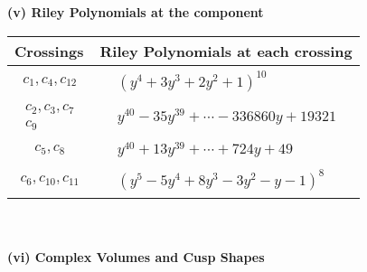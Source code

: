 \documentclass[1p]{elsarticle_modified}
\theoremstyle{definition}
\begin{document}
\newpage\renewcommand{\arraystretch}{1}
\flushleft \textbf{(v) Riley Polynomials at the component}\newline \\
\begin{tabular}{m{50pt}|m{274pt}}
Crossings & \hspace{64pt}Riley Polynomials at each crossing \\
\hline $$\begin{aligned}c_{1},c_{4},c_{12}\end{aligned}$$&$\begin{aligned}
&(y^4+3 y^3+2 y^2+1)^{10}
\end{aligned}$\\
\hline $$\begin{aligned}c_{2},c_{3},c_{7}\\c_{9}\end{aligned}$$&$\begin{aligned}
&y^{40}-35 y^{39}+\cdots-336860 y+19321
\end{aligned}$\\
\hline $$\begin{aligned}c_{5},c_{8}\end{aligned}$$&$\begin{aligned}
&y^{40}+13 y^{39}+\cdots+724 y+49
\end{aligned}$\\
\hline $$\begin{aligned}c_{6},c_{10},c_{11}\end{aligned}$$&$\begin{aligned}
&(y^5-5 y^4+8 y^3-3 y^2- y-1)^8
\end{aligned}$\\
\hline
\end{tabular}\\~\\
\newpage\flushleft \textbf{(vi) Complex Volumes and Cusp Shapes}
\end{document}
